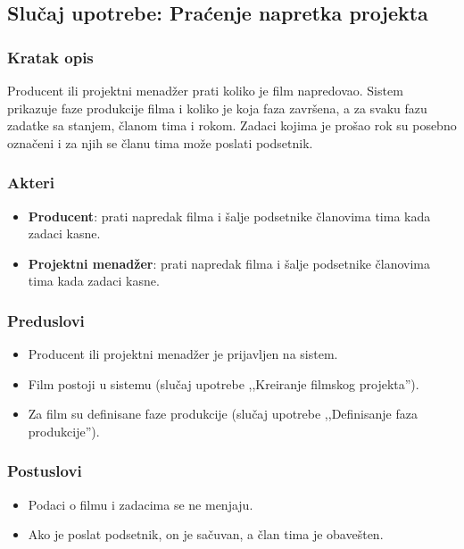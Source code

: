 \subsection{Slučaj upotrebe: Praćenje napretka projekta}

\subsubsection*{Kratak opis}

Producent ili projektni menadžer prati koliko je film napredovao. Sistem prikazuje faze produkcije filma i koliko je koja faza završena, a za svaku fazu zadatke sa stanjem, članom tima i rokom. Zadaci kojima je prošao rok su posebno označeni i za njih se članu tima može poslati podsetnik.

\subsubsection*{Akteri}
\begin{itemize}
    \item \textbf{Producent}: prati napredak filma i šalje podsetnike članovima tima kada zadaci kasne.
    \item \textbf{Projektni menadžer}: prati napredak filma i šalje podsetnike članovima tima kada zadaci kasne.
\end{itemize}

\subsubsection*{Preduslovi}
\begin{itemize}
    \item Producent ili projektni menadžer je prijavljen na sistem.
    \item Film postoji u sistemu (slučaj upotrebe ,,Kreiranje filmskog projekta'').
    \item Za film su definisane faze produkcije (slučaj upotrebe ,,Definisanje faza produkcije'').
\end{itemize}

\subsubsection*{Postuslovi}
\begin{itemize}
    \item Podaci o filmu i zadacima se ne menjaju.
    \item Ako je poslat podsetnik, on je sačuvan, a član tima je obavešten.
\end{itemize}

